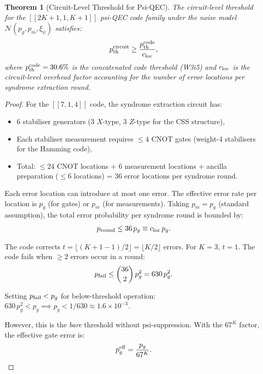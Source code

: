 \documentclass[11pt]{article}
\newtheorem{theorem}{Theorem}[section]
\theoremstyle{definition}
\theoremstyle{remark}
\newcommand{\ee}[1]{\times 10^{#1}}
\begin{document}
\begin{theorem}[Circuit-Level Threshold for Psi-QEC]
\label{thm:circuit-threshold}
The circuit-level threshold for the $[[2K{+}1,1,K{+}1]]$ psi-QEC
code family under the noise model $\mathcal{N}(p_g, p_m, \xi_\psi)$
satisfies:
\begin{equation}
  p_{\rm th}^{\rm circuit} \geq \frac{p_{\rm th}^{\rm code}}{c_{\rm loc}},
  \label{eq:circuit-threshold}
\end{equation}
where $p_{\rm th}^{\rm code} = 30.6\%$ is the concatenated code
threshold (W3i5) and $c_{\rm loc}$ is the circuit-level overhead
factor accounting for the number of error locations per syndrome
extraction round.
\end{theorem}

\begin{proof}
For the $[[7,1,4]]$ code, the syndrome extraction circuit has:
\begin{itemize}[nosep]
  \item 6 stabiliser generators (3 $X$-type, 3 $Z$-type for the
    CSS structure),
  \item Each stabiliser measurement requires $\leq 4$ CNOT gates
    (weight-4 stabilisers for the Hamming code),
  \item Total: $\leq 24$ CNOT locations + 6 measurement locations
    + ancilla preparation ($\leq 6$ locations) = 36 error locations
    per syndrome round.
\end{itemize}

Each error location can introduce at most one error. The effective
error rate per location is $p_g$ (for gates) or $p_m$ (for measurements).
Taking $p_m = p_g$ (standard assumption), the total error probability
per syndrome round is bounded by:
\begin{equation}
  p_{\rm round} \leq 36\,p_g \equiv c_{\rm loc}\,p_g.
\end{equation}

The code corrects $t = \lfloor(K+1-1)/2\rfloor = \lfloor K/2\rfloor$
errors. For $K = 3$, $t = 1$. The code fails when $\geq 2$ errors
occur in a round:
\begin{equation}
  p_{\rm fail} \leq \binom{36}{2}\,p_g^2 = 630\,p_g^2.
  \label{eq:fail-rate}
\end{equation}

Setting $p_{\rm fail} < p_g$ for below-threshold operation:
$630\,p_g^2 < p_g \implies p_g < 1/630 \approx 1.6\ee{-3}$.

However, this is the \emph{bare} threshold without psi-suppression.
With the $67^K$ factor, the effective gate error is:
\begin{equation}
  p_g^{\rm eff} = \frac{p_g}{67^K}.
  \label{eq:effective-pg}
\end{equation}


\end{proof}
\end{document}
